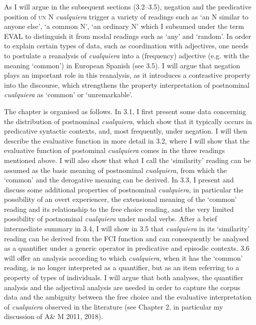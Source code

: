 \documentclass[output=paper]{langscibook}
\begin{document}
  As I will argue in the subsequent sections (3.2–3.5), negation and the predicative position of \textsc{un} N \textit{cualquiera} trigger a variety of readings such as ‘an N similar to anyone else’, ‘a common N’, ‘an ordinary N’ which I subsumed under the term EVAL to distinguish it from modal readings such as ‘any’ and ‘random’. In order to explain certain types of data, such as coordination with adjectives, one needs to postulate a reanalysis of \textit{cualquiera} into a (frequency) adjective (e.g. with the meaning ‘common’) in European Spanish (see 3.5). I will argue that negation plays an important role in this reanalysis, as it introduces a contrastive property into the discourse, which strengthens the property interpretation of postnominal \textit{cualquiera} as ‘common’ or ‘unremarkable’.

  The chapter is organised as follows. In 3.1, I first present some data concerning the distribution of postnominal \textit{cualquiera}, which show that it typically occurs in predicative syntactic contexts, and, most frequently, under negation. I will then describe the evaluative function in more detail in 3.2, where I will show that the evaluative function of postominal \textit{cualquiera} comes in the three readings mentioned above. I will also show that what I call the ‘similarity’ reading can be assumed as the basic meaning of postnominal \textit{cualquiera}, from which the ‘common’ and the derogative meaning can be derived. In 3.3, I present and discuss some additional properties of postnominal \textit{cualquiera}, in particular the possibility of an overt experiencer, the extensional meaning of the ‘common’ reading and its relationship to the free choice reading, and the very limited possibility of postnominal \textit{cualquiera} under modal verbs. After a brief intermediate summary in 3.4, I will show in 3.5 that \textit{cualquiera} in its ‘similarity’ reading can be derived from the FCI function and can consequently be analysed as a quantifier under a generic operator in predicative and episodic contexts. 3.6 will offer an analysis according to which \textit{cualquiera}, when it has the ‘common’ reading, is no longer interpreted as a quantifier, but as an item referring to a property of types of individuals. I will argue that both analyses, the quantifier analysis and the adjectival analysis are needed in order to capture the corpus data and the ambiguity between the free choice and the evaluative interpretation of \textit{cualquiera} observed in the literature (see Chapter 2, in particular my discussion of A\& M 2011, 2018).
\end{document}
